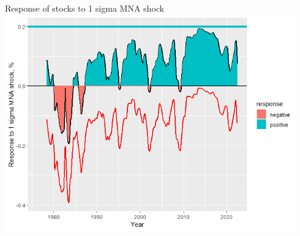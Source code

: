 \documentclass{beamer}
\begin{document}
\normalsize
\begin{frame}{Response of stocks to 1 sigma MNA shock}
\centering
\includegraphics[width=0.94\textwidth]{images/1980s_plot2.png}
\end{frame}
\end{document}
